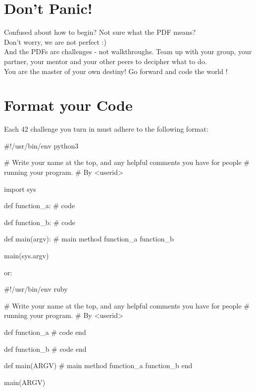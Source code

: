 \documentclass{42-en}
\begin{document}
\chapter{Don't Panic!}

Confused about how to begin? Not sure what the PDF means?\\

Don't worry, we are not perfect :)\\

And the PDFs are challenges - not walkthroughs. Team up with your group, your partner,
your mentor and your other peers to decipher what to do.\\

You are the master of your own destiny! Go forward and code the world ! 


\chapter{Format your Code}

Each 42 challenge you turn in must adhere to the following format:

\begin{42pycode}
#!/usr/bin/env python3

# Write your name at the top, and any helpful comments you have for people
# running your program.
# By <userid>

import sys

def function_a:
    # code

def function_b:
    # code

def main(argv):
    # main method
    function_a
    function_b

main(sys.argv)
\end{42pycode}

or:\\

\begin{42rbcode}
#!/usr/bin/env ruby

# Write your name at the top, and any helpful comments you have for people
# running your program.
# By <userid>

def function_a
 # code
end

def function_b
 # code
end

def main(ARGV)
 # main method
 function_a
 function_b
end

main(ARGV)
\end{42rbcode}
\end{document}
